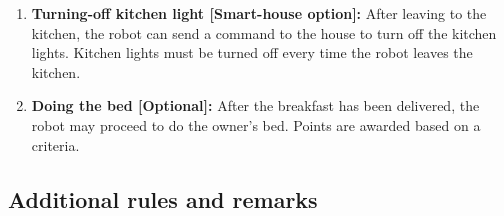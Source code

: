 \begin{enumerate}
	\item \textbf{Turning-off kitchen light [Smart-house option]:} After leaving to the kitchen, the robot can send a command to the house to turn off the kitchen lights. Kitchen lights must be turned off every time the robot leaves the kitchen.

	\item \textbf{Doing the bed [Optional]:} After the breakfast has been delivered, the robot may proceed to do the owner's bed. Points are awarded based on a  criteria.

\end{enumerate}

\subsection{Additional rules and remarks}

